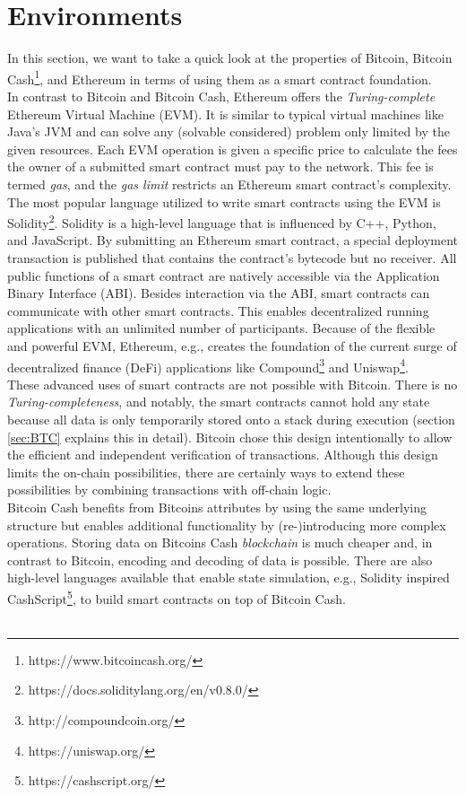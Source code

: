 \documentclass{cacthesis}
\begin{document}
        \section{Environments}
        \label{sec:smartContractOptions}
        In this section, we want to take a quick look at the properties of Bitcoin, Bitcoin Cash\footnote{https://www.bitcoincash.org/}, and Ethereum in terms of using them as a smart contract foundation. \\
        In contrast to Bitcoin and Bitcoin Cash, Ethereum offers the \textit{Turing-complete} Ethereum Virtual Machine (EVM). It is similar to typical virtual machines like Java's JVM and can solve any (solvable considered) problem only limited by the given resources. Each EVM operation is given a specific price to calculate the fees the owner of a submitted smart contract must pay to the network. This fee is termed \textit{gas}, and the \textit{gas limit} restricts an Ethereum smart contract's complexity. The most popular language utilized to write smart contracts using the EVM is Solidity\footnote{https://docs.soliditylang.org/en/v0.8.0/}. Solidity is a high-level language that is influenced by C++, Python, and JavaScript. By submitting an Ethereum smart contract, a special deployment transaction is published that contains the contract's bytecode but no receiver. All public functions of a smart contract are natively accessible via the Application Binary Interface (ABI). Besides interaction via the ABI, smart contracts can communicate with other smart contracts. This enables decentralized running applications with an unlimited number of participants. Because of the flexible and powerful EVM, Ethereum, e.g., creates the foundation of the current surge of decentralized finance (DeFi) applications like Compound\footnote{http://compoundcoin.org/} and Uniswap\footnote{https://uniswap.org/}. \\
        These advanced uses of smart contracts are not possible with Bitcoin. There is no \textit{Turing-completeness}, and notably, the smart contracts cannot hold any state because all data is only temporarily stored onto a stack during execution (section \ref{sec:BTC} explains this in detail). Bitcoin chose this design intentionally to allow the efficient and independent verification of transactions. Although this design limits the on-chain possibilities, there are certainly ways to extend these possibilities by combining transactions with off-chain logic. \\
        Bitcoin Cash benefits from Bitcoins attributes by using the same underlying structure but enables additional functionality by (re-)introducing more complex operations. Storing data on Bitcoins Cash \textit{blockchain} is much cheaper and, in contrast to Bitcoin, encoding and decoding of data is possible. There are also high-level languages available that enable state simulation, e.g., Solidity inspired CashScript\footnote{https://cashscript.org/}, to build smart contracts on top of Bitcoin Cash. \\\\
\end{document}
